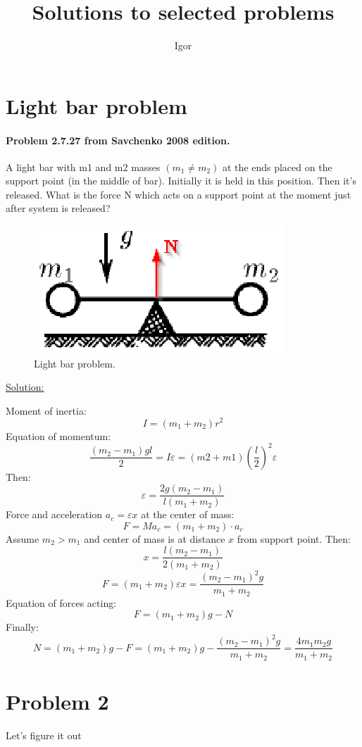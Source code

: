 \documentclass[12pt, letterpaper]{article}
\begin{document}
\title{Solutions to selected problems}
\author{Igor}
\maketitle

\tableofcontents

\newpage
\section{Light bar problem}
\paragraph{Problem 2.7.27 from Savchenko 2008 edition.\\}
A light bar with m1 and m2 masses $(m_1 \neq m_2)$ at the ends placed on the support point (in the middle of  bar). Initially it is held in this position. Then it's released.
What is the force N which acts on a support point at the moment just after system is released?

\begin{figure}[!htbp]
	\centering
	\includegraphics[totalheight=2cm]{./images/LightBarProblem.eps}
	\caption{Light bar problem.}
	\label{fig:verticalcell}
\end{figure}

\noindent\underline{\large Solution:}
\vspace{0.2in}
\begin{addmargin}[1em]{2em}
Moment of inertia:
$$I=(m_1+m_2)r^2$$
Equation of momentum:
$$\frac {(m_2-m_1)gl} {2}=I\varepsilon=(m2+m1)(\frac l 2)^2\varepsilon$$
Then:
$$\varepsilon=\frac {2g(m_2-m_1)} {l(m_1+m_2)}$$
Force and acceleration $a_c=\varepsilon x$ at the center of mass:
$$F=Ma_c=(m_1+m_2) \cdot a_c$$
Assume $m_2>m_1$ and center of mass is at distance $x$ from support point. Then: $$x=\frac {l(m_2-m_1)} {2(m_1+m_2)}$$
$$F=(m_1+m_2)\varepsilon x=\frac {(m_2-m_1)^2g} {m_1+m_2}$$
Equation of forces acting:
$$F=(m_1+m_2)g-N$$
Finally: $$N=(m_1+m_2)g-F=(m_1+m_2)g-\frac {(m_2-m_1)^2g} {m_1+m_2}=\frac {4m_1m_2g} {m_1+m_2}$$
\end{addmargin}

\section{Problem 2}
Let's figure it out
\end{document}
